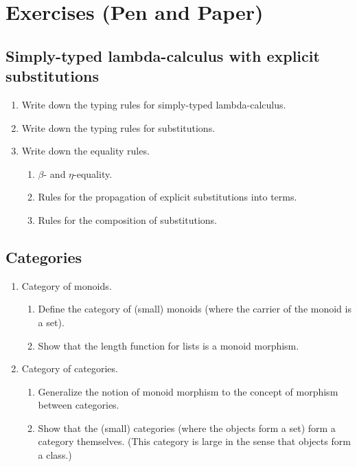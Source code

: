 \documentclass[a4paper,fleqn]{scrartcl}
\begin{document}
\clearpage

\section{Exercises (Pen and Paper)}

\subsection{Simply-typed lambda-calculus with explicit substitutions}

\begin{enumerate}
\item Write down the typing rules for simply-typed lambda-calculus.
\item Write down the typing rules for substitutions.
\item Write down the equality rules.
  \begin{enumerate}
  \item $\beta$- and $\eta$-equality.
  \item Rules for the propagation of explicit substitutions into
    terms.
  \item Rules for the composition of substitutions.
  \end{enumerate}
\end{enumerate}

\subsection{Categories}

\begin{enumerate}

\item Category of monoids.
  \begin{enumerate}
  \item Define the category of (small) monoids (where the carrier of
    the monoid is a set).
  \item Show that the length function for lists is a monoid morphism.
  \end{enumerate}

\item Category of categories.
  \begin{enumerate}
  \item Generalize the notion of monoid morphism to the concept of
    morphism between categories.
  \item Show that the (small) categories (where the objects form a
    set) form a category themselves.  (This category is large in the
    sense that objects form a class.)
  \end{enumerate}

\end{enumerate}
\end{document}
